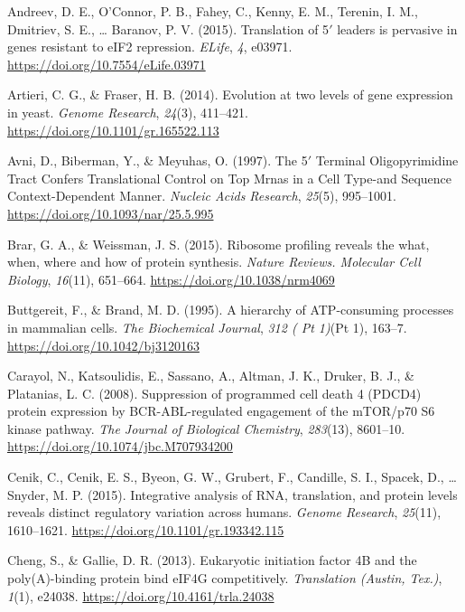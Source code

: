 \documentclass[12pt,openany]{book}
\begin{document}
\hypertarget{refs}{}
\hypertarget{ref-Andreev2015}{}
Andreev, D. E., O'Connor, P. B., Fahey, C., Kenny, E. M., Terenin, I.
M., Dmitriev, S. E., \ldots{} Baranov, P. V. (2015). Translation of
5\({'}\) leaders is pervasive in genes resistant to eIF2 repression.
\emph{ELife}, \emph{4}, e03971.
\url{https://doi.org/10.7554/eLife.03971}

\hypertarget{ref-Artieri2014}{}
Artieri, C. G., \& Fraser, H. B. (2014). Evolution at two levels of gene
expression in yeast. \emph{Genome Research}, \emph{24}(3), 411--421.
\url{https://doi.org/10.1101/gr.165522.113}

\hypertarget{ref-Avni1997}{}
Avni, D., Biberman, Y., \& Meyuhas, O. (1997). The 5\({'}\) Terminal
Oligopyrimidine Tract Confers Translational Control on Top Mrnas in a
Cell Type-and Sequence Context-Dependent Manner. \emph{Nucleic Acids
Research}, \emph{25}(5), 995--1001.
\url{https://doi.org/10.1093/nar/25.5.995}

\hypertarget{ref-Brar2015}{}
Brar, G. A., \& Weissman, J. S. (2015). Ribosome profiling reveals the
what, when, where and how of protein synthesis. \emph{Nature Reviews.
Molecular Cell Biology}, \emph{16}(11), 651--664.
\url{https://doi.org/10.1038/nrm4069}

\hypertarget{ref-Buttgereit1995}{}
Buttgereit, F., \& Brand, M. D. (1995). A hierarchy of ATP-consuming
processes in mammalian cells. \emph{The Biochemical Journal}, \emph{312
( Pt 1)}(Pt 1), 163--7. \url{https://doi.org/10.1042/bj3120163}

\hypertarget{ref-Carayol2008}{}
Carayol, N., Katsoulidis, E., Sassano, A., Altman, J. K., Druker, B. J.,
\& Platanias, L. C. (2008). Suppression of programmed cell death 4
(PDCD4) protein expression by BCR-ABL-regulated engagement of the
mTOR/p70 S6 kinase pathway. \emph{The Journal of Biological Chemistry},
\emph{283}(13), 8601--10. \url{https://doi.org/10.1074/jbc.M707934200}

\hypertarget{ref-Cenik2015}{}
Cenik, C., Cenik, E. S., Byeon, G. W., Grubert, F., Candille, S. I.,
Spacek, D., \ldots{} Snyder, M. P. (2015). Integrative analysis of RNA,
translation, and protein levels reveals distinct regulatory variation
across humans. \emph{Genome Research}, \emph{25}(11), 1610--1621.
\url{https://doi.org/10.1101/gr.193342.115}

\hypertarget{ref-Cheng2013}{}
Cheng, S., \& Gallie, D. R. (2013). Eukaryotic initiation factor 4B and
the poly(A)-binding protein bind eIF4G competitively. \emph{Translation
(Austin, Tex.)}, \emph{1}(1), e24038.
\url{https://doi.org/10.4161/trla.24038}
\end{document}
